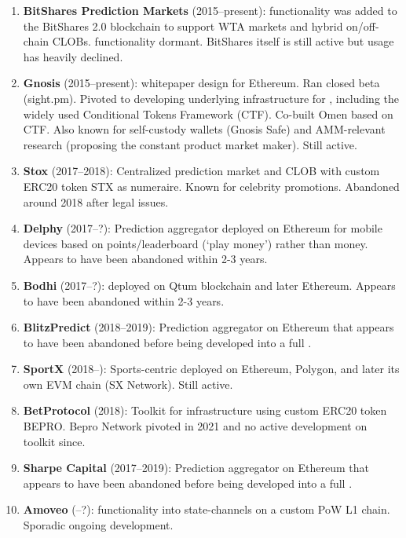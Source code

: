 \begin{enumerate}
\item \textbf{BitShares Prediction Markets} (2015--present): \depm functionality was added to the BitShares 2.0 blockchain to support WTA markets and hybrid on/off-chain CLOBs. \depm functionality dormant. BitShares itself is still active but usage has heavily declined.
 
\item \textbf{Gnosis} (2015--present): \depm whitepaper design for Ethereum. Ran closed beta (sight.pm). Pivoted to developing underlying infrastructure for \depms, including the widely used Conditional Tokens Framework (CTF). Co-built Omen based on CTF. Also known for self-custody wallets (Gnosis Safe) and AMM-relevant research (proposing the constant product market maker). Still active. 

\item \textbf{Stox} (2017--2018): Centralized prediction market and CLOB with custom ERC20 token STX as numeraire. Known for celebrity promotions. Abandoned around 2018 after legal issues. 

\item \textbf{Delphy} (2017--?): Prediction aggregator deployed on Ethereum for mobile devices based on points/leaderboard (`play money') rather than money. Appears to have been abandoned within 2-3 years.

\item \textbf{Bodhi} (2017--?): \depm deployed on Qtum blockchain and later Ethereum. Appears to have been abandoned within 2-3 years. 

\item \textbf{BlitzPredict} (2018--2019): Prediction aggregator on Ethereum that appears to have been abandoned before being developed into a full \depm.

\item \textbf{SportX} (2018--): Sports-centric \depm deployed on Ethereum, Polygon, and later its own EVM chain (SX Network). Still active.

\item \textbf{BetProtocol} (2018): Toolkit for \depm infrastructure using custom ERC20 token BEPRO. Bepro Network pivoted in 2021 and no active development on toolkit since.

\item \textbf{Sharpe Capital} (2017--2019): Prediction aggregator on Ethereum that appears to have been abandoned before being developed into a full \depm.

\item \textbf{Amoveo} (--?): \depm functionality into state-channels on a custom PoW L1 chain. Sporadic ongoing development.


\end{enumerate}
